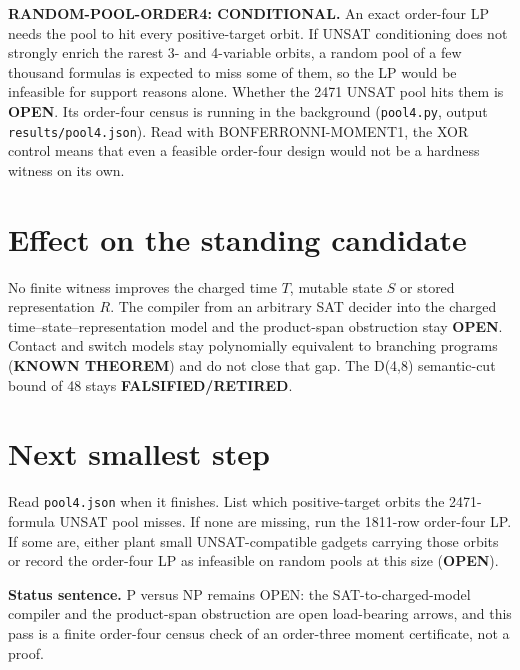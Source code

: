 \documentclass[11pt]{article}
\begin{document}
\textbf{RANDOM-POOL-ORDER4: CONDITIONAL.} An exact order-four LP needs the pool to hit every positive-target orbit. If UNSAT conditioning does not strongly enrich the rarest 3- and 4-variable orbits, a random pool of a few thousand formulas is expected to miss some of them, so the LP would be infeasible for support reasons alone. Whether the 2471 UNSAT pool hits them is \textbf{OPEN}. Its order-four census is running in the background (\texttt{pool4.py}, output \texttt{results/pool4.json}). Read with BONFERRONNI-MOMENT1, the XOR control means that even a feasible order-four design would not be a hardness witness on its own.

\section*{Effect on the standing candidate}
No finite witness improves the charged time $T$, mutable state $S$ or stored representation $R$. The compiler from an arbitrary SAT decider into the charged time--state--representation model and the product-span obstruction stay \textbf{OPEN}. Contact and switch models stay polynomially equivalent to branching programs (\textbf{KNOWN THEOREM}) and do not close that gap. The D(4,8) semantic-cut bound of 48 stays \textbf{FALSIFIED/RETIRED}.

\section*{Next smallest step}
Read \texttt{pool4.json} when it finishes. List which positive-target orbits the 2471-formula UNSAT pool misses. If none are missing, run the 1811-row order-four LP. If some are, either plant small UNSAT-compatible gadgets carrying those orbits or record the order-four LP as infeasible on random pools at this size (\textbf{OPEN}).

\bigskip
\noindent\textbf{Status sentence.} P versus NP remains OPEN: the SAT-to-charged-model compiler and the product-span obstruction are open load-bearing arrows, and this pass is a finite order-four census check of an order-three moment certificate, not a proof.
\end{document}
